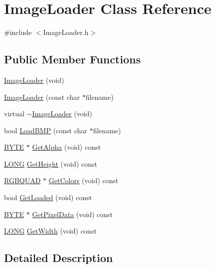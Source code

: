 \hypertarget{class_image_loader}{
\section{ImageLoader Class Reference}
\label{class_image_loader}
}


{\ttfamily \#include $<$ImageLoader.h$>$}

\subsection*{Public Member Functions}
\begin{DoxyCompactItemize}
\item 
\hyperlink{class_image_loader_aff8e0ecf1611ba1c2d9f1fbf6f4efb38}{ImageLoader} (void)
\item 
\hyperlink{class_image_loader_aa68025bde21fa6566ad43d04b61fa211}{ImageLoader} (const char $\ast$filename)
\item 
virtual \hyperlink{class_image_loader_acce398271fc04e6a5ab9707d9210cb3e}{$\sim$ImageLoader} (void)
\item 
bool \hyperlink{class_image_loader_a24fdb991574efb5d45afc1aae608f9d0}{LoadBMP} (const char $\ast$filename)
\item 
\hyperlink{_image_loader_8h_a4ae1dab0fb4b072a66584546209e7d58}{BYTE} $\ast$ \hyperlink{class_image_loader_a216f7a6ba0bd49a673de772e0e6dca29}{GetAlpha} (void) const 
\item 
\hyperlink{_image_loader_8h_a9154c0d0c21af4686624543215b4e5f2}{LONG} \hyperlink{class_image_loader_a82df5f39b2a699ab215ae2f1c714b76e}{GetHeight} (void) const 
\item 
\hyperlink{_image_loader_8h_ae6f8a4686bbcb20bd72057e00143b167}{RGBQUAD} $\ast$ \hyperlink{class_image_loader_ae6e6d2dff943e9596fc16dd27a4851a0}{GetColors} (void) const 
\item 
bool \hyperlink{class_image_loader_a142aaed3cf7bb654af091d215ce05091}{GetLoaded} (void) const 
\item 
\hyperlink{_image_loader_8h_a4ae1dab0fb4b072a66584546209e7d58}{BYTE} $\ast$ \hyperlink{class_image_loader_a3a4ed52e7b28bb4f48f967de8bf702a9}{GetPixelData} (void) const 
\item 
\hyperlink{_image_loader_8h_a9154c0d0c21af4686624543215b4e5f2}{LONG} \hyperlink{class_image_loader_ab673a17dd93d0a4393934afc14b86885}{GetWidth} (void) const 
\end{DoxyCompactItemize}


\subsection{Detailed Description}


